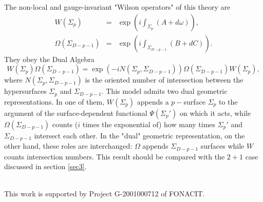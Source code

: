 \documentclass[a4paper,12pt]{article}
\begin{document}
The non-local and gauge-invariant "Wilson operators" of this
theory are
\begin{eqnarray}
W(\Sigma_p)&=&\exp{\left(i\int_{\Sigma_p}(A+d\omega)\right)},\\
\Omega(\Sigma_{D-p-1})&=&\exp{\left(i\int_{\Sigma_{D-p-1}}\!\!\!\!\!\!\!\!(B+dC)\right)}.
\end{eqnarray}
They obey the Dual Algebra
\begin{equation}
W(\Sigma_p)\Omega(\Sigma_{D-p-1})=\exp{\left(-iN(\Sigma_p,\Sigma_{D-p-1})\right)}\Omega(\Sigma_{D-p-1})W(\Sigma_p),
\end{equation}
where $N(\Sigma_p,\Sigma_{D-p-1})$ is the oriented number of
intersection between the hypersurfaces $\Sigma_p$ and
$\Sigma_{D-p-1}$.
This model admits two dual geometric
representations. In one of them, $W(\Sigma_p)$ appends a
$p-$surface $\Sigma_p$ to the argument of the surface-dependent
functional $\Psi({\Sigma_p '})$ on which it acts, while
$\Omega(\Sigma_{D-p-1})$ counts ($i$ times the exponential of)
how many times $\Sigma_p '$ and $\Sigma_{D-p-1}$ intersect each
other. In the "dual" geometric representation, on the other hand,
these roles are interchanged: $\Omega$ appends $ \Sigma_{D-p-1}$
surfaces while $W$ counts intersection numbers. This result
should be compared with the $2+1$ case discussed in section
\ref{sec3}.


\\
This work is supported by Project G-2001000712 of FONACIT.
\end{document}
